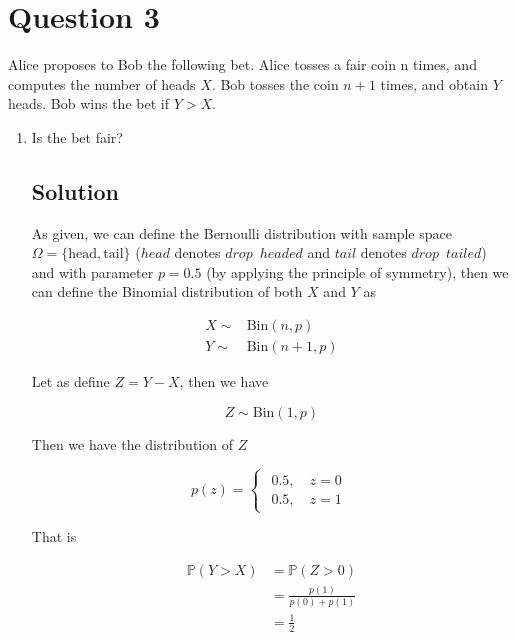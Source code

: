 \documentclass[12pt]{article}
\newcommand{\bP}{\mathbb{P}}
\begin{document}
	
	\section*{Question 3}
	
	\noindent Alice proposes to Bob the following bet. Alice tosses a fair coin n times, and computes the number of heads $X$. Bob tosses the coin $n+1$ times, and obtain $Y$ heads. Bob wins the bet if $Y > X$.
	
	\bigskip
	
	\begin{enumerate}[start=1,label={\bfseries Part \arabic*:},leftmargin=0in]
		\bigskip\item Is the bet fair?
		
		\subsection*{Solution}
		
			As given, we can define the Bernoulli distribution with sample space $\Omega = \{\text{head},\text{tail}\}$ ($head$ denotes $drop\enspace headed$ and $tail$ denotes $drop\enspace tailed$) and with parameter $p = 0.5$ (by applying the principle of symmetry), then we can define the Binomial distribution of both $X$ and $Y$ as
			
			\[
				\begin{aligned}
					X\sim &\text{Bin}(n,p)\\
					Y\sim &\text{Bin}(n+1,p)
				\end{aligned}
			\]
			
			Let as define $Z = Y - X$, then we have
			
			\[Z\sim \text{Bin}(1,p)\]
			
			Then we have the distribution of $Z$
			
			\[
				p(z) =
				\begin{cases}
					\begin{aligned}
						0.5,\quad z = 0\\
						0.5,\quad z = 1
					\end{aligned}
				\end{cases}
			\]
			
			That is
			
			\[
				\begin{aligned}
					\bP(Y > X) &= \bP(Z > 0)\\
					&= \frac{p(1)}{p(0) + p(1)}\\
					&= \frac{1}{2}
				\end{aligned}
			\]
		

\end{enumerate}
\end{document}
